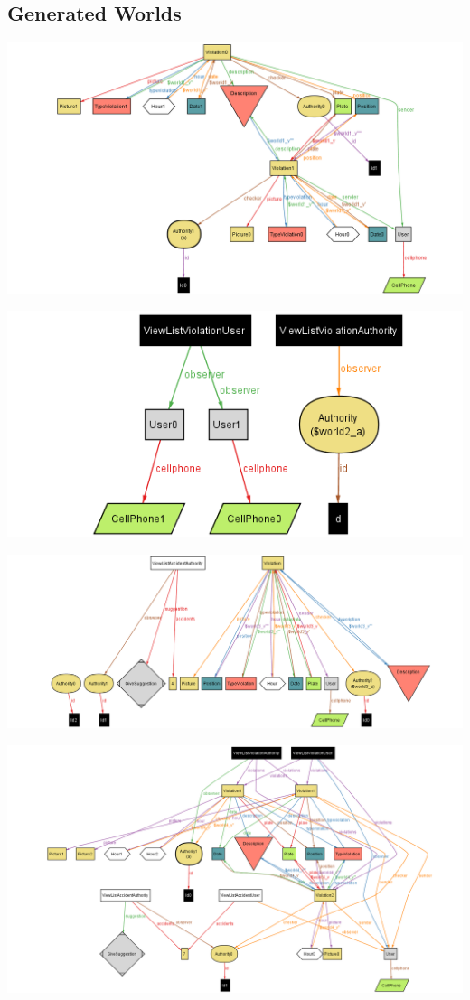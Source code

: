 
\vspace{1cm}
\subsection{Generated Worlds}

\vspace{1cm}
\includegraphics[width=\textwidth]{Images/AlloyWorlds/World1.png}
\newpage

\vspace{1cm}
\includegraphics[width=\textwidth]{Images/AlloyWorlds/World2.png}
\vspace{1cm}

\vspace{1cm}
\includegraphics[width=\textwidth]{Images/AlloyWorlds/World3.png}
\newpage

\includegraphics[width=\textwidth]{Images/AlloyWorlds/World4.png}